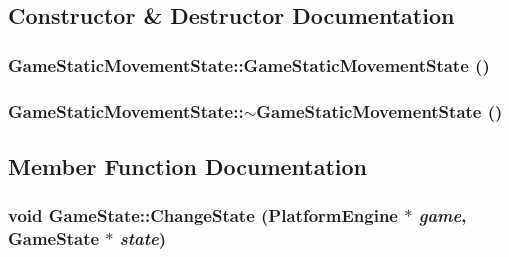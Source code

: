 \subsection{Constructor \& Destructor Documentation}
\hypertarget{class_game_static_movement_state_13354d331108d7aeb78822e629d631b3}{
\subsubsection[{GameStaticMovementState}]{\setlength{\rightskip}{0pt plus 5cm}GameStaticMovementState::GameStaticMovementState ()}}
\label{d7/d3b/class_game_static_movement_state_13354d331108d7aeb78822e629d631b3}


\hypertarget{class_game_static_movement_state_3b89c6650fba993b81abd1d5b11a82c3}{
\subsubsection[{$\sim$GameStaticMovementState}]{\setlength{\rightskip}{0pt plus 5cm}GameStaticMovementState::$\sim$GameStaticMovementState ()}}
\label{d7/d3b/class_game_static_movement_state_3b89c6650fba993b81abd1d5b11a82c3}




\subsection{Member Function Documentation}
\hypertarget{class_game_state_f786aeb704a22a135dc289bb89fcc452}{
\subsubsection[{ChangeState}]{\setlength{\rightskip}{0pt plus 5cm}void GameState::ChangeState ({\bf PlatformEngine} $\ast$ {\em game}, \/  {\bf GameState} $\ast$ {\em state})}}
\label{dd/d87/class_game_state_f786aeb704a22a135dc289bb89fcc452}


